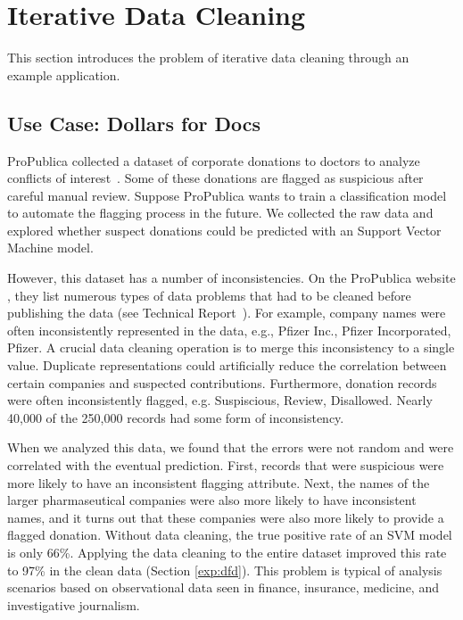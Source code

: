 \section{Iterative Data Cleaning}\label{background}
This section introduces the problem of iterative data cleaning through an example application.

\subsection{Use Case: Dollars for Docs}\label{s:usecase}
ProPublica collected a dataset of corporate donations to doctors to analyze conflicts of interest~\cite{dollarsfordocsa}. 
Some of these donations are flagged as suspicious after careful manual review.
Suppose ProPublica wants to train a classification model to automate the flagging process in the future.
We collected the raw data and explored whether suspect donations could be predicted with an Support Vector Machine model.

However, this dataset has a number of inconsistencies.
On the ProPublica website \cite{dollarsfordocs}, they list numerous types of data problems that had to be cleaned before publishing the data (see Technical Report~\cite{activecleanarxiv}).
For example, company names were often inconsistently represented in the data, e.g., Pfizer Inc., Pfizer Incorporated, Pfizer.
A crucial data cleaning operation is to merge this inconsistency to a single value.
Duplicate representations could artificially reduce the correlation between certain companies and suspected contributions.
Furthermore, donation records were often inconsistently flagged, e.g. Suspiscious, Review, Disallowed.
Nearly 40,000 of the 250,000 records had some form of inconsistency.

When we analyzed this data, we found that the errors were not random and were correlated with the eventual prediction.
First, records that were suspicious were more likely to have an inconsistent flagging attribute.
Next, the names of the larger pharmaseutical companies were also more likely to have inconsistent names, and it turns out that these companies were also more likely to provide a flagged donation.
Without data cleaning, the true positive rate of an SVM model is only 66\%.
Applying the data cleaning to the entire dataset improved this rate to 97\% in the clean data (Section \ref{exp:dfd}).
This problem is typical of analysis scenarios based on observational data seen in finance, insurance, medicine, and investigative journalism.

